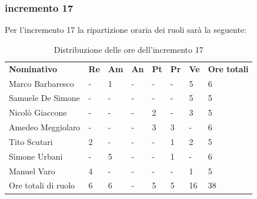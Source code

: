 \subsubsection{incremento 17}
Per l'incremento 17 la ripartizione oraria dei ruoli sarà la seguente:
\begin{center}
    \begin{table}[ht!]
        \centering
        \caption{Distribuzione delle ore dell'incremento 17}
        \vspace{5px}
        \renewcommand{\arraystretch}{1.8}
        \begin{tabular}{p{100px} p{20px} p{20px} p{20px} p{20px} p{20px} p{20px} p{50px} }
            \rowcolor{logo!70} \textbf{Nominativo} & \textbf{Re} & \textbf{Am} & \textbf{An} & \textbf{Pt} & \textbf{Pr} & \textbf{Ve} & \textbf{Ore totali} \\
            Marco Barbaresco                       & -           & 1           & -           & -           & -           & 5           & 6                   \\
            Samuele De Simone                      & -           & -           & -           & -           & -           & 5           & 5                   \\
            Nicolò Giaccone                        & -           & -           & -           & 2           & -           & 3           & 5                   \\
            Amedeo Meggiolaro                      & -           & -           & -           & 3           & 3           & -           & 6                   \\
            Tito Scutari                           & 2           & -           & -           & -           & 1           & 2           & 5                   \\
            Simone Urbani                          & -           & 5           & -           & -           & 1           & -           & 6                   \\
            Manuel Varo                            & 4           & -           & -           & -           & -           & 1           & 5                   \\
            Ore totali di ruolo                    & 6           & 6           & -           & 5           & 5          & 16           & 38                  \\
        \end{tabular}
    \end{table}
\end{center}
